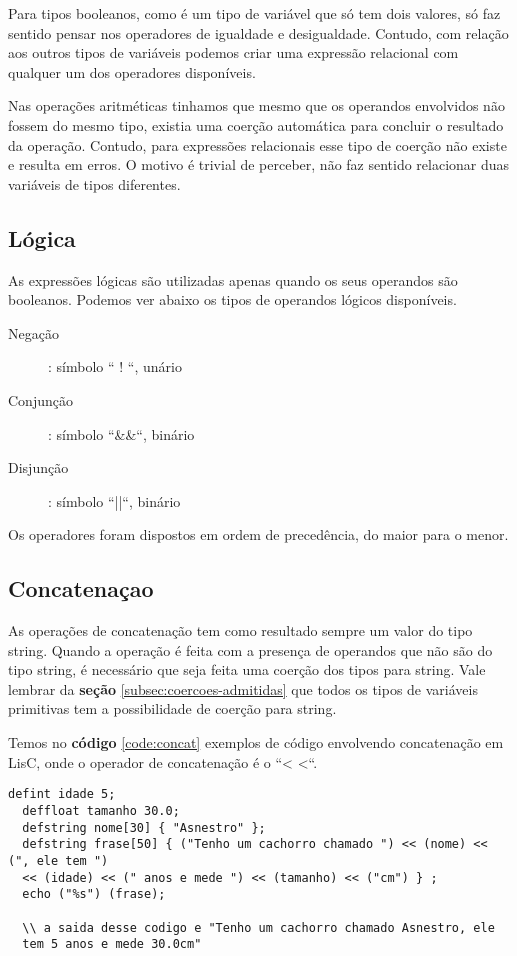 \documentclass[
  12pt,				%
  oneside,			%
  a4paper,			%
  english,			%
  french,				%
  spanish,			%
  brazil,				%
]{abntex2}
\begin{document}
Para tipos booleanos, como é um tipo de variável que só tem dois
valores, só faz sentido pensar nos operadores de igualdade e
desigualdade. Contudo, com relação aos outros tipos de variáveis
podemos criar uma expressão relacional com qualquer um dos operadores
disponíveis.

Nas operações aritméticas tinhamos que mesmo que os
operandos envolvidos não fossem do mesmo tipo, existia uma coerção
automática para concluir o resultado da operação. Contudo, para
expressões relacionais esse tipo de coerção não existe e resulta em
erros. O motivo é trivial de perceber, não faz sentido relacionar duas
variáveis de tipos diferentes.

\subsection{Lógica}
\label{subsec:logicas}

As expressões lógicas são utilizadas apenas quando os seus operandos
são booleanos. Podemos ver abaixo os tipos de operandos lógicos
disponíveis.

\begin{description}
\item [Negação]: símbolo `` ! ``, unário
\item [Conjunção]: símbolo ``\&\&``, binário
\item [Disjunção]: símbolo ``||``, binário
\end{description}

Os operadores foram dispostos em ordem de precedência, do maior para o
menor.

\subsection{Concatenaçao}
\label{subsec:concatenacao}

As operações de concatenação tem como resultado sempre um valor do
tipo string. Quando a operação é feita com a presença de operandos que
não são do tipo string, é necessário que seja feita uma coerção dos
tipos para string. Vale lembrar da \textbf{seção} \ref{subsec:coercoes-admitidas} que todos os tipos de
variáveis primitivas tem a possibilidade de coerção para
string.


Temos no \textbf{código} \ref{code:concat} exemplos de código
envolvendo concatenação em LisC, onde o operador de concatenação é o
``< <``.

\begin{lstlisting}[label=code:concat,caption=Exemplo de expressões de concatenação]
  defint idade 5;
  deffloat tamanho 30.0;
  defstring nome[30] { "Asnestro" };
  defstring frase[50] { ("Tenho um cachorro chamado ") << (nome) << (", ele tem ")
  << (idade) << (" anos e mede ") << (tamanho) << ("cm") } ;
  echo ("%s") (frase);
  
  \\ a saida desse codigo e "Tenho um cachorro chamado Asnestro, ele
  tem 5 anos e mede 30.0cm"
\end{lstlisting}
\end{document}
